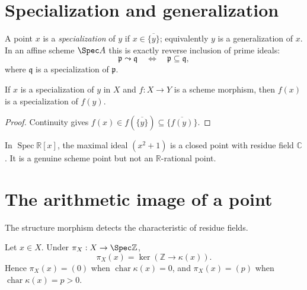 

\section{Specialization and generalization}
A point $x$ is a \emph{specialization} of $y$ if $x\in\overline{\{y\}}$; equivalently $y$ is a
generalization of $x$.  In an affine scheme $\Spec A$ this is exactly reverse inclusion of prime
ideals:
\[
 \mathfrak p\leadsto\mathfrak q
 \quad\Longleftrightarrow\quad
 \mathfrak p\subseteq\mathfrak q,
\]
where $\mathfrak q$ is a specialization of $\mathfrak p$.

\begin{proposition}\label{prop:vi21-specialization}
If $x$ is a specialization of $y$ in $X$ and $f:X\to Y$ is a scheme morphism, then $f(x)$ is a
specialization of $f(y)$.
\end{proposition}
\begin{proof}
Continuity gives
$f(x)\in f(\overline{\{y\}})\subseteq\overline{\{f(y)\}}$.
\end{proof}



\begin{example}\label{ex:vi21-expand-02}
In $\operatorname{Spec}\mathbb R[x]$, the maximal ideal $(x^2+1)$ is a closed point with residue field $\mathbb C$.  It is a genuine scheme point but not an $\mathbb R$-rational point.
\end{example}
\section{The arithmetic image of a point}
The structure morphism detects the characteristic of residue fields.

\begin{proposition}\label{prop:vi21-residue-characteristic}
Let $x\in X$.  Under $\pi_X:X\to\Spec\mathbb Z$,
\[
 \pi_X(x)=\ker(\mathbb Z\to\kappa(x)).
\]
Hence $\pi_X(x)=(0)$ when $\operatorname{char}\kappa(x)=0$, and
$\pi_X(x)=(p)$ when $\operatorname{char}\kappa(x)=p>0$.
\end{proposition}



